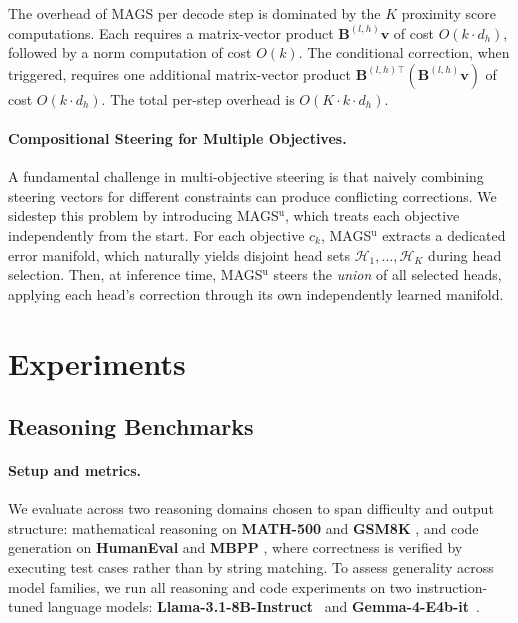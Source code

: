 \documentclass{article}
\newcommand{\bB}{\bm{B}}
\newcommand{\ours}{MAGS}
\begin{document}
The overhead of \ours{} per decode step is dominated by the $K$ proximity score computations. Each requires a matrix-vector product $\bB^{(l,h)}\bm{v}$ of cost $O(k \cdot d_h)$, followed by a norm computation of cost $O(k)$. The conditional correction, when triggered, requires one additional matrix-vector product $\bB^{(l,h)\top}(\bB^{(l,h)}\bm{v})$ of cost $O(k \cdot d_h)$. The total per-step overhead is $O(K \cdot k \cdot d_h)$.

\paragraph{Compositional Steering for Multiple Objectives.}
A fundamental challenge in multi-objective steering is that naively combining steering vectors for different constraints can produce conflicting corrections. We sidestep this problem by introducing MAGS$^\text{u}$, which treats each objective independently from the start. For each objective $c_k$, MAGS$^\text{u}$ extracts a dedicated error manifold, which naturally yields disjoint head sets $\mathcal{H}_1, \dots, \mathcal{H}_K$ during head selection. Then, at inference time, MAGS$^\text{u}$ steers the \emph{union} of all selected heads, applying each head's correction through its own independently learned manifold. 

\section{Experiments}
\label{sec:exp}
\subsection{Reasoning Benchmarks}
\paragraph{Setup and metrics.}
We evaluate across two reasoning domains chosen to span difficulty and output structure: mathematical reasoning on \textbf{MATH-500} \cite{lightman2023verify} and \textbf{GSM8K} \cite{cobbe2021gsm8k}, and code generation on \textbf{HumanEval} \cite{chen2021codex} and \textbf{MBPP} \cite{austin2021program}, where correctness is verified by executing test cases rather than by string matching.  To assess generality across model families, we run all reasoning
and code experiments on two instruction-tuned language models:
\textbf{Llama-3.1-8B-Instruct}~\cite{grattafiori2024llama3} and \textbf{Gemma-4-E4b-it}~\cite{gemma4team2025}.
\end{document}
